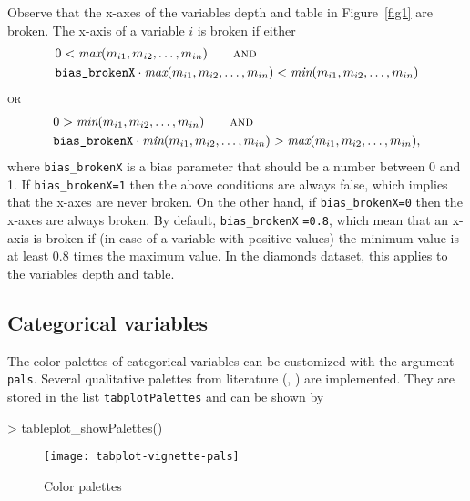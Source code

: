 \documentclass[11pt, fleqn, a4paper]{article}
\begin{document}
Observe that the x-axes of the variables depth and table in Figure~\ref{fig1} are broken. The x-axis of a variable $i$ is broken if
either
\begin{align*}
& 0 < \textit{max}(m_{i1}, m_{i2},\ldots, m_{in}) \qquad \textsc{and}\\
& \mbox{{\tt bias\_brokenX}} \cdot \textit{max}(m_{i1}, m_{i2},\ldots, m_{in}) < \textit{min}(m_{i1}, m_{i2},\ldots, m_{in}) 
\end{align*}
\textsc{or}
\begin{align*}
& 0 > \textit{min}(m_{i1}, m_{i2},\ldots, m_{in}) \qquad \textsc{and}\\
& \mbox{{\tt bias\_brokenX}} \cdot \textit{min}(m_{i1}, m_{i2},\ldots, m_{in}) > \textit{max}(m_{i1}, m_{i2},\ldots, m_{in}),
\end{align*}
where {\tt bias\_brokenX} is a bias parameter that should be a number between 0 and 1. If {\tt bias\_brokenX=1} then the above conditions are always false, which implies that the x-axes are never broken. On the other hand, if {\tt bias\_brokenX=0} then the x-axes are always broken. By default, {\tt bias\_brokenX} {\tt=0.8}, which mean that an x-axis is broken if (in case of a variable with positive values) the minimum value is at least 0.8 times the maximum value. In the diamonds dataset, this applies to the variables depth and table.


\subsection{Categorical variables}
The color palettes of categorical variables can be customized with the argument {\tt pals}. Several qualitative palettes from literature (\cite{brewer}, \cite{??}) are implemented. They are stored in the list {\tt tabplotPalettes} and can be shown by




\begin{Schunk}
\begin{Sinput}
> tableplot_showPalettes()
\end{Sinput}
\end{Schunk}

\begin{figure}
\begin{center}
\texttt{[image: tabplot-vignette-pals]}
\end{center}
\caption{Color palettes}
\label{fig:pals}
\end{figure}
\end{document}
